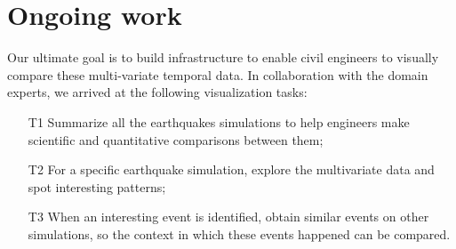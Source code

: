 \section{Ongoing work} %
\label{sec:vis}

Our ultimate goal is to build infrastructure to enable civil engineers to visually compare these multi-variate temporal data. In collaboration with the domain experts, we arrived at the following visualization tasks:
\begin{itemize}
	\item [T1]  Summarize all the earthquakes simulations to help engineers make scientific and quantitative comparisons between them; 
	\item [T2] For a specific earthquake simulation, explore the multivariate data and spot interesting patterns;
	\item [T3] When an interesting event is identified, obtain similar events on other simulations, so the context in which these events happened can be compared.
\end{itemize} 



